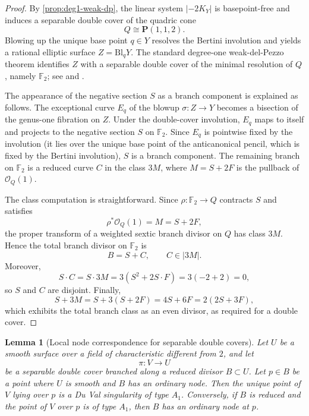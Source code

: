 \documentclass[11pt]{article}
\newtheorem{lemma}[lemma]{Lemma}
\theoremstyle{definition}
\newcommand{\Bl}{\mathrm{Bl}}
\begin{document}
\begin{proof}
By \cref{prop:deg1-weak-dp}, the linear system $|-2K_Y|$ is basepoint-free and induces a separable double cover of the quadric cone
\[
Q\cong \mathbf P(1,1,2).
\]
Blowing up the unique base point $q\in Y$ resolves the Bertini involution and yields a rational elliptic surface $Z=\Bl_qY$. The standard degree-one weak-del-Pezzo theorem identifies $Z$ with a separable double cover of the minimal resolution of $Q$, namely $\mathbb F_2$; see \cite[Prop.~2.2 and Rem.~2.3]{AscherBejleri21} and \cite{HW81}.

The appearance of the negative section $S$ as a branch component is explained as follows. The exceptional curve $E_q$ of the blowup $\sigma\colon Z\to Y$ becomes a bisection of the genus-one fibration on $Z$. Under the double-cover involution, $E_q$ maps to itself and projects to the negative section $S$ on $\mathbb F_2$. Since $E_q$ is pointwise fixed by the involution (it lies over the unique base point of the anticanonical pencil, which is fixed by the Bertini involution), $S$ is a branch component. The remaining branch on $\mathbb F_2$ is a reduced curve $C$ in the class $3M$, where $M=S+2F$ is the pullback of $\mathcal O_Q(1)$.

The class computation is straightforward. Since $\rho\colon \mathbb F_2\to Q$ contracts $S$ and satisfies
\[
\rho^*\mathcal O_Q(1)=M=S+2F,
\]
the proper transform of a weighted sextic branch divisor on $Q$ has class $3M$. Hence the total branch divisor on $\mathbb F_2$ is
\[
B=S+C,\qquad C\in |3M|.
\]
Moreover,
\[
S\cdot C = S\cdot 3M = 3(S^2+2S\cdot F)=3(-2+2)=0,
\]
so $S$ and $C$ are disjoint. Finally,
\[
S+3M = S+3(S+2F)=4S+6F=2(2S+3F),
\]
which exhibits the total branch class as an even divisor, as required for a double cover.
\end{proof}

\begin{lemma}[Local node correspondence for separable double covers]\label{lem:node-correspondence}
Let $U$ be a smooth surface over a field of characteristic different from $2$, and let
\[
\pi\colon V\to U
\]
be a separable double cover branched along a reduced divisor $B\subset U$. Let $p\in B$ be a point where $U$ is smooth and $B$ has an ordinary node. Then the unique point of $V$ lying over $p$ is a Du Val singularity of type $A_1$. Conversely, if $B$ is reduced and the point of $V$ over $p$ is of type $A_1$, then $B$ has an ordinary node at $p$.
\end{lemma}
\end{document}
